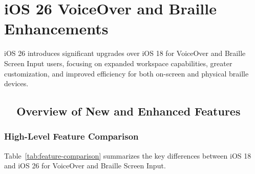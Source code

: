 \chapter{iOS 26 VoiceOver and Braille Enhancements}

iOS 26 introduces significant upgrades over iOS 18 for VoiceOver and Braille Screen Input users, focusing on expanded workspace capabilities, greater customization, and improved efficiency for both on-screen and physical braille devices\supercite{nelowvision2025,myvision2025,applevisVO2024}.

\section{~~Overview of New and Enhanced Features}

\subsection{High-Level Feature Comparison}
Table~\ref{tab:feature-comparison} summarizes the key differences between iOS 18 and iOS 26 for VoiceOver and Braille Screen Input.

